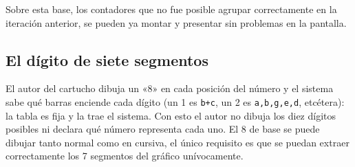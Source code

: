 Sobre esta base, los contadores que no fue posible agrupar correctamente en la iteración anterior, se pueden ya montar y presentar sin problemas en la pantalla.

\subsection{El dígito de siete segmentos}
\label{subsec:SieteSegmentosF3I10}

El autor del cartucho dibuja un «8» en cada posición del número y el sistema sabe
qué barras enciende cada dígito (un 1 es \texttt{b+c}, un 2 es
\texttt{a,b,g,e,d}, etcétera): la tabla es fija y la trae el sistema. Con esto
el autor no dibuja los diez dígitos posibles ni declara qué número representa
cada uno. El 8 de base se puede dibujar tanto normal como en cursiva, el único requisito
es que se puedan extraer correctamente los 7 segmentos del gráfico unívocamente.

